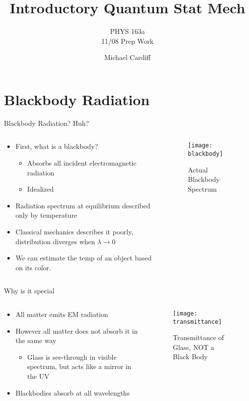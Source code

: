 \documentclass{beamer}
\title{Introductory Quantum Stat Mech}
\author{Michael Cardiff}
\subtitle{PHYS 163a \\ 11/08 Prep Work}
\begin{document}
\begin{frame}
  \titlepage
\end{frame}

\section{Blackbody Radiation}
\begin{frame}{Blackbody Radiation? Huh?}
  \begin{columns}
    \begin{column}{0.5\textwidth}
      \begin{itemize}
      \item First, what is a blackbody?
        \begin{itemize}
        \item Absorbs all incident electromagnetic radiation
        \item Idealized
        \end{itemize}
      \item Radiation spectrum at equilibrium described only by temperature
      \item Classical mechanics describes it poorly, distribution diverges when $\lambda\to0$
      \item We can estimate the temp of an object based on its color. 
      \end{itemize}
    \end{column}
    \begin{column}{0.5\textwidth}
      \begin{figure}[H]
        \centering
        \texttt{[image: blackbody]}
        \caption{Actual Blackbody Spectrum}
      \end{figure}
    \end{column}
  \end{columns}
\end{frame}

\begin{frame}{Why is it special}
  \begin{columns}
    \begin{column}{0.5\textwidth}
      \begin{itemize}
      \item All matter emits EM radiation
      \item However all matter does not absorb it in the same way
        \begin{itemize}
        \item Glass is see-through in visible spectrum, but acts like a mirror in the UV
        \end{itemize}
      \item Blackbodies absorb at all wavelengths
      \end{itemize}
    \end{column}
    \begin{column}{0.5\textwidth}
      \begin{figure}[H]
        \centering
        \texttt{[image: transmittance]}
        \caption{Transmittance of Glass, NOT a Black Body}
      \end{figure}
    \end{column}
  \end{columns}
\end{frame}
\end{document}
